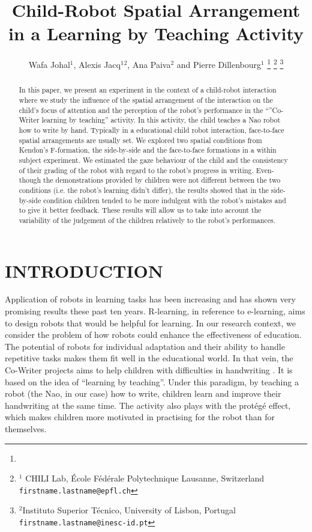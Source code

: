 \documentclass[letterpaper, 10 pt, conference]{ieeeconf}  %
\title{\LARGE \bf
Child-Robot Spatial Arrangement in a Learning by Teaching Activity}
\author{Wafa Johal$^{1}$, Alexis Jacq$^{1}$$^{2}$, Ana Paiva$^{2}$ and Pierre Dillenbourg$^{1}$  %
\thanks{}%
\thanks{$^{1}$ CHILI Lab,
        École Fédérale Polytechnique Lausanne, Switzerland
        {\tt\small firstname.lastname@epfl.ch}}%
\thanks{$^{2}$Instituto Superior T\'{e}cnico, University of Lisbon, Portugal
        {\tt\small firstname.lastname@inesc-id.pt}}%
}
\begin{document}
\maketitle


\begin{abstract}
In this paper, we present an experiment in the context of a child-robot interaction where we study the influence of the spatial arrangement of the interaction on the child's focus of attention and the perception of the robot's performance in the ``''Co-Writer learning by teaching'' activity.
In this activity, the child teaches a Nao robot how to write by hand.
Typically in a educational child robot interaction, face-to-face spatial arrangements are usually set.
We explored two spatial conditions from Kendon's F-formation, the side-by-side and the face-to-face formations in a within subject experiment.
We estimated the gaze behaviour of the child and the consistency of their grading of the robot with regard to the robot's progress in writing. 
Even-though the demonstrations provided by children were not different between the two conditions (i.e. the robot's learning didn't differ),  the results showed that in the side-by-side condition children tended to be more indulgent with the robot's mistakes and to give it better feedback.
These results will allow us to take into account the variability of the judgement of the children relatively to the robot's performances.
\end{abstract}


\section{INTRODUCTION}

Application of robots in learning tasks has been increasing and has shown very promising results these past ten years. 
R-learning, in reference to e-learning, aims to design robots that would be helpful for learning.
In our research context, we consider the problem of how robots could enhance the effectiveness of education.
The potential of robots for individual adaptation and their ability to handle repetitive tasks makes them fit well in the educational world.
In that vein, the Co-Writer projects aims to help children with difficulties in handwriting \cite{hood2015when}.
It is based on the idea of ``learning by teaching''.
Under this paradigm, by teaching a robot (the Nao, in our case) how to write, children learn and improve their handwriting at the same time.
The activity also plays with the protégé effect, which makes children more motivated in practising for the robot than for themselves.
\end{document}
